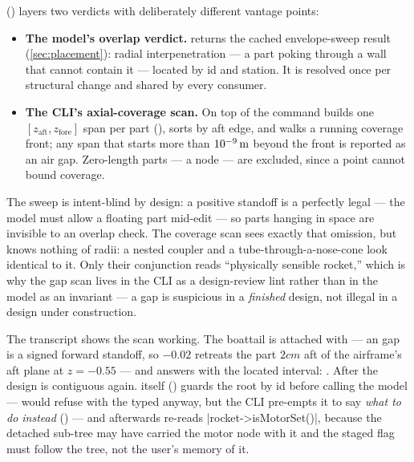  () layers two verdicts with deliberately different
vantage points:

\begin{itemize}
\item \textbf{The model's overlap verdict.}  returns the cached
      envelope-sweep result (\cref{sec:placement}): radial interpenetration --- a part poking
      through a wall that cannot contain it --- located by id and station. It is resolved once per
      structural change and shared by every consumer.
\item \textbf{The CLI's axial-coverage scan.} On top of  the command
      builds one $[z_{\mathrm{aft}}, z_{\mathrm{fore}}]$ span per part
      (), sorts by aft edge, and walks a running coverage front; any span
      that starts more than $10^{-9}\,\mathrm{m}$ beyond the front is reported as an air gap. Zero-length
      parts --- a  node --- are excluded, since a point cannot bound coverage.
\end{itemize}

\begin{keyinsight}
The sweep is intent-blind by design: a positive standoff is a perfectly legal 
--- the model must allow a floating part mid-edit --- so parts hanging in space are invisible to
an overlap check. The coverage scan sees exactly that omission, but knows nothing of radii: a
nested coupler and a tube-through-a-nose-cone look identical to it. Only their conjunction reads
``physically sensible rocket,'' which is why the gap scan lives in the CLI as a design-review
lint rather than in the model as an invariant --- a gap is suspicious in a \emph{finished}
design, not illegal in a design under construction.
\end{keyinsight}

The transcript shows the scan working. The boattail is attached with  --- an
 gap is a signed forward standoff, so $-0.02$ retreats the part $2\unit{cm}$ aft of the
airframe's aft plane at $z = -0.55$ --- and  answers with the located interval:
. After  the design is contiguous
again.  itself () guards the root by id before calling
the model ---  would refuse with the typed  anyway, but the
CLI pre-empts it to say \emph{what to do instead} () --- and
afterwards re-reads \cppinline|rocket->isMotorSet()|, because the detached sub-tree may have
carried the motor node with it and the staged  flag must follow the tree, not the
user's memory of it.

